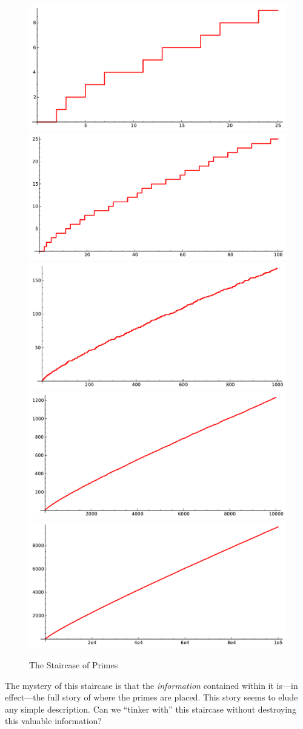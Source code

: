 \documentclass[openany]{book}
\theoremstyle{plain}
\theoremstyle{definition}
\begin{document}
\begin{figure}[H]
\centering
\includegraphics[width=.4\textwidth]{illustrations/PN_25}
\includegraphics[width=.4\textwidth]{illustrations/PN_100}\\

\includegraphics[width=.4\textwidth]{illustrations/PN_1000}
\includegraphics[width=.4\textwidth]{illustrations/PN_10000}\\

\includegraphics[width=.6\textwidth]{illustrations/PN_100000}


\caption{The Staircase of Primes\label{fig:staircases}}
\end{figure}

The mystery of this staircase is that the {\em information} contained
within it is---in effect---the full story of where the primes are
placed. This story seems to elude any simple description.  Can we
``tinker with'' this staircase without destroying this valuable
information?
\end{document}

